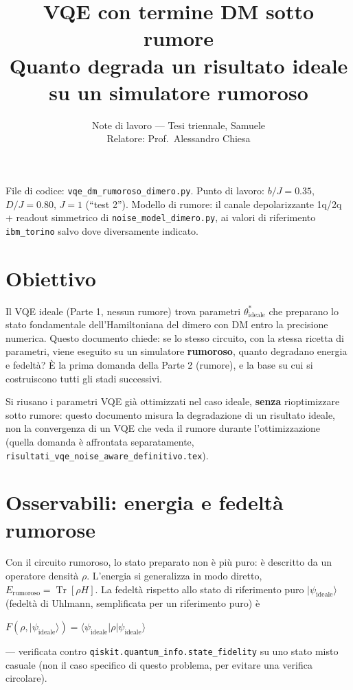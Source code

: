 \documentclass[11pt,a4paper]{article}
\title{\vspace{-1.5em}\color{inkblue}VQE con termine DM sotto rumore\\[0.2em]
\Large\normalfont\color{softgray}Quanto degrada un risultato ideale su un simulatore rumoroso}
\author{Note di lavoro --- Tesi triennale, Samuele\\ Relatore: Prof.\ Alessandro Chiesa}
\date{}
\newcommand{\Tr}{\operatorname{Tr}}
\newcommand{\ket}[1]{\lvert #1 \rangle}
\newcommand{\bra}[1]{\langle #1 \rvert}
\begin{document}
\sloppy
\maketitle
\thispagestyle{fancy}
\vspace{-2.0em}

File di codice: \texttt{vqe\_dm\_rumoroso\_dimero.py}. Punto di lavoro:
$b/J=0.35$, $D/J=0.80$, $J=1$ (``test 2''). Modello di rumore: il
canale depolarizzante 1q/2q + readout simmetrico di
\texttt{noise\_model\_dimero.py}, ai valori di riferimento
\texttt{ibm\_torino} salvo dove diversamente indicato.

\tableofcontents

\section{Obiettivo}

Il VQE ideale (Parte 1, nessun rumore) trova parametri
$\theta^*_\text{ideale}$ che preparano lo stato fondamentale
dell'Hamiltoniana del dimero con DM entro la precisione numerica. Questo
documento chiede: se lo stesso circuito, con la stessa ricetta di
parametri, viene eseguito su un simulatore \textbf{rumoroso}, quanto
degradano energia e fedeltà? È la prima domanda della Parte 2 (rumore),
e la base su cui si costruiscono tutti gli stadi successivi.

\begin{keyeq}[title={Scelta di modellazione dichiarata}]
\centering
Si riusano i parametri VQE già ottimizzati nel caso ideale, \textbf{senza}
rioptimizzare sotto rumore: questo documento misura la degradazione di un
risultato ideale, non la convergenza di un VQE che veda il rumore durante
l'ottimizzazione (quella domanda è affrontata separatamente,
\texttt{risultati\_vqe\_noise\_aware\_definitivo.tex}).
\end{keyeq}

\section{Osservabili: energia e fedeltà rumorose}

Con il circuito rumoroso, lo stato preparato non è più puro: è descritto
da un operatore densità $\rho$. L'energia si generalizza in modo diretto,
$E_\text{rumoroso}=\Tr[\rho H]$. La fedeltà rispetto allo stato di
riferimento puro $\ket{\psi_\text{ideale}}$ (fedeltà di Uhlmann,
semplificata per un riferimento puro) è
\begin{keyeq}
\centering
$F(\rho,\ket{\psi_\text{ideale}}) = \bra{\psi_\text{ideale}}\rho\ket{\psi_\text{ideale}}$
\end{keyeq}
--- verificata contro \texttt{qiskit.quantum\_info.state\_fidelity} su
uno stato misto casuale (non il caso specifico di questo problema, per
evitare una verifica circolare).
\end{document}
